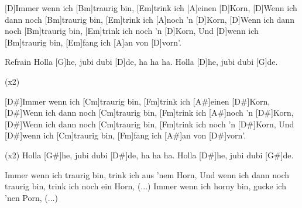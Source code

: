 


\begin{guitar}
	[D]Immer wenn ich [Bm]traurig bin, [Em]trink ich [A]einen [D]Korn,
	[D]Wenn ich dann noch [Bm]traurig bin, [Em]trink ich [A]noch 'n [D]Korn,
	[D]Wenn ich dann noch [Bm]traurig bin, [Em]trink ich noch 'n [D]Korn,
	Und [D]wenn ich [Bm]traurig bin, [Em]fang ich [A]an von [D]vorn'.
	
  \begin{chorus}{Refrain}
	Holla [G]he, jubi dubi [D]de, ha ha ha.
	Holla [D]he, jubi dubi [G]de.%
  \end{chorus}
	
	 
	
	  (x2)
	
	[D#]Immer wenn ich [Cm]traurig bin, [Fm]trink ich [A#]einen [D#]Korn,
	[D#]Wenn ich dann noch [Cm]traurig bin, [Fm]trink ich [A#]noch 'n [D#]Korn,
	[D#]Wenn ich dann noch [Cm]traurig bin, [Fm]trink ich noch 'n [D#]Korn,
	Und [D#]wenn ich [Cm]traurig bin, [Fm]fang ich [A#]an von [D#]vorn'.
	
	 (x2)
	Holla [G#]he, jubi dubi [D#]de, ha ha ha.
	Holla [D#]he, jubi dubi [G#]de.

  \medskip
  Immer wenn ich traurig bin, trink ich aus 'nem Horn,
  Und wenn ich dann noch traurig bin, trink ich noch ein Horn,
  (...)
  \smallskip
  Immer wenn ich horny bin, gucke ich 'nen Porn,
  (...)
\end{guitar}
